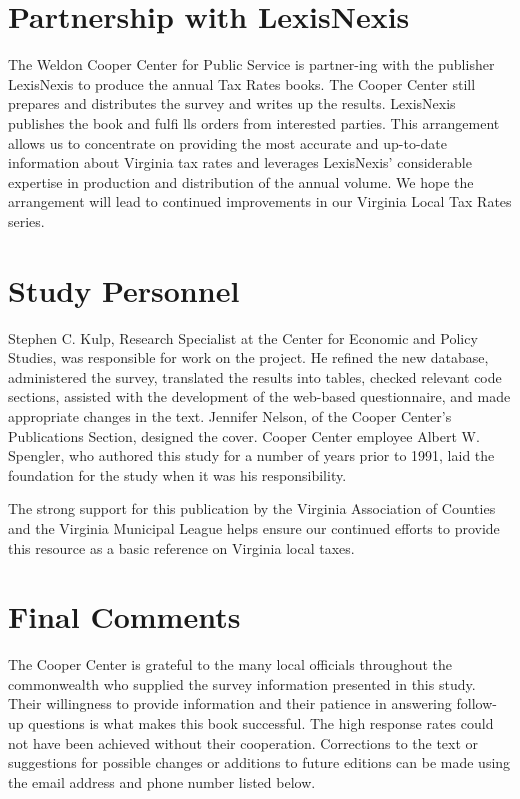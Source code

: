 \documentclass[
]{book}
\begin{document}
\hypertarget{partnership-with-lexisnexis}{%
\section{Partnership with LexisNexis}\label{partnership-with-lexisnexis}}

The Weldon Cooper Center for Public Service is partner-ing with the publisher LexisNexis to produce the annual Tax Rates books. The Cooper Center still prepares and distributes the survey and writes up the results. LexisNexis publishes the book and fulfi lls orders from interested parties. This arrangement allows us to concentrate on providing the most accurate and up-to-date information about Virginia tax rates and leverages LexisNexis' considerable expertise in production and distribution of the annual volume. We hope the arrangement will lead to continued improvements in our Virginia Local Tax Rates series.

\hypertarget{study-personnel}{%
\section{Study Personnel}\label{study-personnel}}

Stephen C. Kulp, Research Specialist at the Center for Economic and Policy Studies, was responsible for work on the project. He refined the new database, administered the survey, translated the results into tables, checked relevant code sections, assisted with the development of the web-based questionnaire, and made appropriate changes in the text. Jennifer Nelson, of the Cooper Center's Publications Section, designed the cover. Cooper Center employee Albert W. Spengler, who authored this study for a number of years prior to 1991, laid the foundation for the study when it was his responsibility.

The strong support for this publication by the Virginia Association of Counties and the Virginia Municipal League helps ensure our continued efforts to provide this resource as a basic reference on Virginia local taxes.

\hypertarget{final-comments}{%
\section{Final Comments}\label{final-comments}}

The Cooper Center is grateful to the many local officials throughout the commonwealth who supplied the survey information presented in this study. Their willingness to provide information and their patience in answering follow-up questions is what makes this book successful. The high response rates could not have been achieved without their cooperation. Corrections to the text or suggestions for possible changes or additions to future editions can be made using the email address and phone number listed below.
\end{document}
